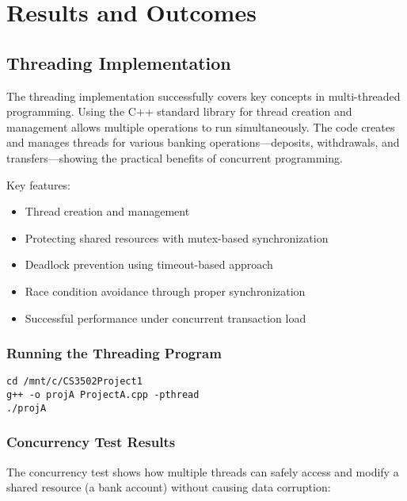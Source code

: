 \documentclass[12pt]{article}
\begin{document}
\section{Results and Outcomes}
\subsection{Threading Implementation}
The threading implementation successfully covers key concepts in multi-threaded programming. Using the C++ standard library for thread creation and management allows multiple operations to run simultaneously. The code creates and manages threads for various banking operations—deposits, withdrawals, and transfers—showing the practical benefits of concurrent programming.

Key features:
\begin{itemize}
    \item Thread creation and management
    \item Protecting shared resources with mutex-based synchronization
    \item Deadlock prevention using timeout-based approach
    \item Race condition avoidance through proper synchronization
    \item Successful performance under concurrent transaction load
\end{itemize}

\subsubsection{Running the Threading Program}
\begin{lstlisting}[style=consolestyle, caption=Running the Threading Program in Ubuntu Terminal]
cd /mnt/c/CS3502Project1
g++ -o projA ProjectA.cpp -pthread
./projA
\end{lstlisting}

\subsubsection{Concurrency Test Results}
The concurrency test shows how multiple threads can safely access and modify a shared resource (a bank account) without causing data corruption:
\end{document}
